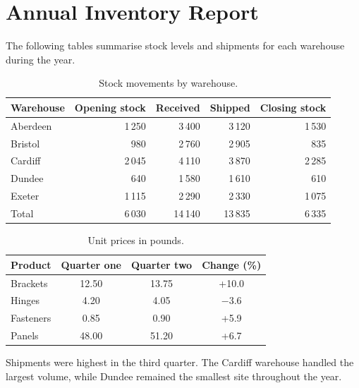 \documentclass[10pt]{article}
\begin{document}
\section*{Annual Inventory Report}
The following tables summarise stock levels and shipments for each warehouse during the year.
\begin{table}[h]
\centering
\begin{tabular}{lrrrr}
\toprule
Warehouse & Opening stock & Received & Shipped & Closing stock\\
\midrule
Aberdeen & 1\,250 & 3\,400 & 3\,120 & 1\,530\\
Bristol & 980 & 2\,760 & 2\,905 & 835\\
Cardiff & 2\,045 & 4\,110 & 3\,870 & 2\,285\\
Dundee & 640 & 1\,580 & 1\,610 & 610\\
Exeter & 1\,115 & 2\,290 & 2\,330 & 1\,075\\
\midrule
Total & 6\,030 & 14\,140 & 13\,835 & 6\,335\\
\bottomrule
\end{tabular}
\caption{Stock movements by warehouse.}
\end{table}
\begin{table}[h]
\centering
\begin{tabular}{|l|c|c|c|}
\hline
Product & Quarter one & Quarter two & Change (\%)\\
\hline
Brackets & 12.50 & 13.75 & +10.0\\
Hinges & 4.20 & 4.05 & $-3.6$\\
Fasteners & 0.85 & 0.90 & +5.9\\
Panels & 48.00 & 51.20 & +6.7\\
\hline
\end{tabular}
\caption{Unit prices in pounds.}
\end{table}
Shipments were highest in the third quarter. The Cardiff warehouse handled the largest volume,
while Dundee remained the smallest site throughout the year.
\end{document}
